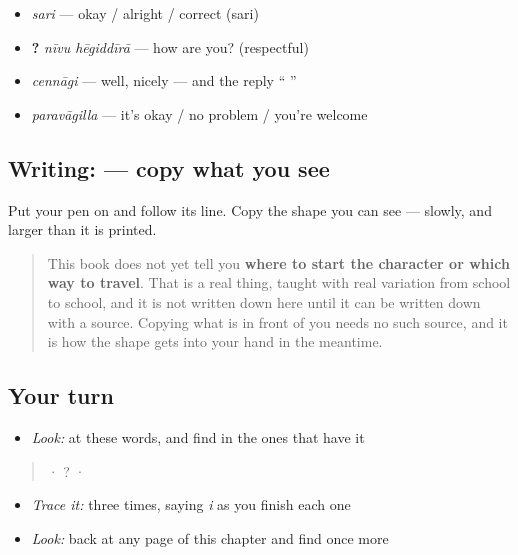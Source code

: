\begin{itemize}
\raggedright
  \item \textbf{} \emph{sari} — okay / alright / correct (sari)
  \item \textbf{ ?} \emph{nīvu hēgiddīrā} — how are you? (respectful)
  \item \textbf{} \emph{cennāgi} — well, nicely — and the reply \textquotedblleft{} \textquotedblright{}
  \item \textbf{} \emph{paravāgilla} — it's okay / no problem / you're welcome
\end{itemize}

\subsection*{Writing:  — copy what you see}
Put your pen on  and follow its line. Copy the shape you can see — slowly, and larger than it is printed.

\begin{quote}
This book does not yet tell you \textbf{where to start the character or which way to travel}. That is a real thing, taught with real variation from school to school, and it is not written down here until it can be written down with a source. Copying what is in front of you needs no such source, and it is how the shape gets into your hand in the meantime.
\end{quote}

\subsection*{Your turn}
\begin{itemize}
\raggedright
  \item \emph{Look:} at these words, and find  in the ones that have it
\end{itemize}

\begin{quote}
  ·   ?  ·  
\end{quote}

\begin{itemize}
\raggedright
  \item \emph{Trace it:}  three times, saying \emph{i} as you finish each one
  \item \emph{Look:} back at any page of this chapter and find  once more
\end{itemize}

